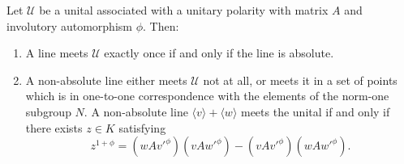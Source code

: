 Let $\mathcal{U}$ be a unital associated with a unitary polarity with matrix $A$ and involutory automorphism $\phi$. Then:

\begin{enumerate}
\item[(i)] A line meets $\mathcal{U}$ exactly once if and only if the line is absolute.
\item[(ii)] A non-absolute line either meets $\mathcal{U}$ not at all, or meets it in a set of points which is in one-to-one correspondence with the elements of the norm-one subgroup $N$. A non-absolute line $\langle v \rangle + \langle w \rangle$ meets the unital if and only if there exists $z \in K$ satisfying
$$z^{1+\phi} = (w A v'^{\phi})(v A w'^{\phi}) - (v A v'^{\phi})(w A w'^{\phi}).$$
\end{enumerate}

